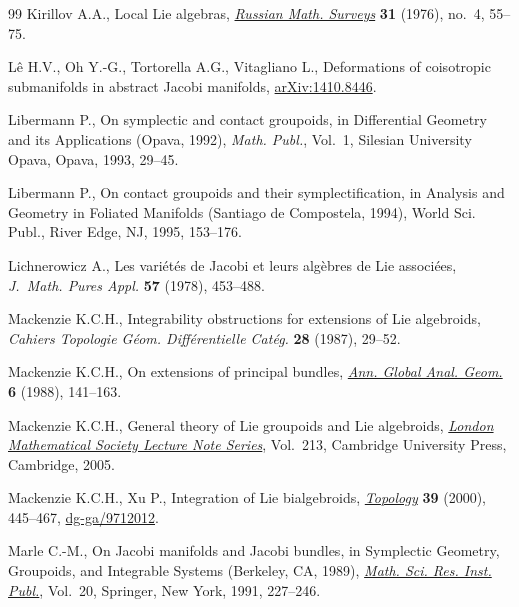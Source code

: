 \documentclass[10pt,a4paper]{amsart}
\numberwithin{equation}{section}
\begin{document}
\begin{thebibliography}{99}
Kirillov A.A., Local {L}ie algebras, \href{https://doi.org/10.1070/RM1976v031n04ABEH001556}{\textit{Russian Math. Surveys}} \textbf{31}
 (1976), no.~4, 55--75.

L\^{e} H.V., Oh Y.-G., Tortorella A.G., Vitagliano L., Deformations of
 coisotropic submanifolds in abstract {J}acobi manifolds, \href{https://arxiv.org/abs/1410.8446}{arXiv:1410.8446}.

Libermann P., On symplectic and contact groupoids, in Differential Geometry and
 its Applications ({O}pava, 1992), \textit{Math. Publ.}, Vol.~1, Silesian
 University Opava, Opava, 1993, 29--45.

Libermann P., On contact groupoids and their symplectif\/ication, in Analysis and
 Geometry in Foliated Manifolds ({S}antiago de {C}ompostela, 1994), World Sci.
 Publ., River Edge, NJ, 1995, 153--176.

Lichnerowicz A., Les vari\'et\'es de {J}acobi et leurs alg\`ebres de {L}ie
 associ\'ees, \textit{J.~Math. Pures Appl.} \textbf{57} (1978), 453--488.

Mackenzie K.C.H., Integrability obstructions for extensions of {L}ie algebroids,
 \textit{Cahiers Topologie G\'eom. Diff\'erentielle Cat\'eg.} \textbf{28}
 (1987), 29--52.

Mackenzie K.C.H., On extensions of principal bundles, \href{https://doi.org/10.1007/BF00133036}{\textit{Ann. Global Anal.
 Geom.}} \textbf{6} (1988), 141--163.

Mackenzie K.C.H., General theory of {L}ie groupoids and {L}ie algebroids,
 \href{https://doi.org/10.1017/CBO9781107325883}{\textit{London Mathematical Society Lecture Note Series}}, Vol.~213, Cambridge
 University Press, Cambridge, 2005.

Mackenzie K.C.H., Xu P., Integration of {L}ie bialgebroids, \href{https://doi.org/10.1016/S0040-9383(98)00069-X}{\textit{Topology}}
 \textbf{39} (2000), 445--467, \href{https://arxiv.org/abs/dg-ga/9712012}{dg-ga/9712012}.

Marle C.-M., On {J}acobi manifolds and {J}acobi bundles, in Symplectic Geometry,
 Groupoids, and Integrable Systems ({B}erkeley, {CA}, 1989), \href{https://doi.org/10.1007/978-1-4613-9719-9_16}{\textit{Math.
 Sci. Res. Inst. Publ.}}, Vol.~20, Springer, New York, 1991, 227--246.


\end{thebibliography}
\end{document}

